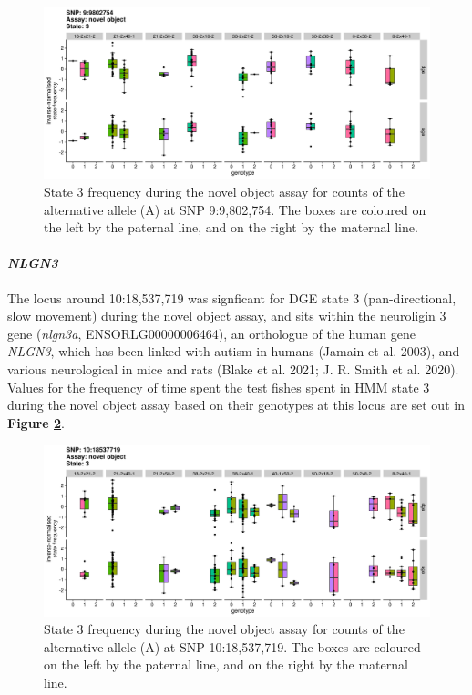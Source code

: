 \documentclass[
]{book}
\begin{document}
\begin{figure}
\includegraphics[width=1\linewidth]{figs/mikk_behaviour/sig_snps_boxplots/3-9:9802754} \caption{State 3 frequency during the novel object assay for counts of the alternative allele (A) at SNP 9:9,802,754. The boxes are coloured on the left by the paternal line, and on the right by the maternal line.}\label{fig:sig-snp-9-9mb}
\end{figure}

\hypertarget{nlgn3}{%
\paragraph{\texorpdfstring{\emph{NLGN3}}{NLGN3}}\label{nlgn3}}

The locus around 10:18,537,719 was signficant for DGE state 3 (pan-directional, slow movement) during the novel object assay, and sits within the neuroligin 3 gene (\emph{nlgn3a}, ENSORLG00000006464), an orthologue of the human gene \emph{NLGN3}, which has been linked with autism in humans (Jamain et al. 2003), and various neurological in mice and rats (Blake et al. 2021; J. R. Smith et al. 2020). Values for the frequency of time spent the test fishes spent in HMM state 3 during the novel object assay based on their genotypes at this locus are set out in \textbf{Figure \ref{fig:sig-snp-10-18mb}}.



\begin{figure}
\includegraphics[width=1\linewidth]{figs/mikk_behaviour/sig_snps_boxplots/3-10:18537719} \caption{State 3 frequency during the novel object assay for counts of the alternative allele (A) at SNP 10:18,537,719. The boxes are coloured on the left by the paternal line, and on the right by the maternal line.}\label{fig:sig-snp-10-18mb}
\end{figure}
\end{document}
